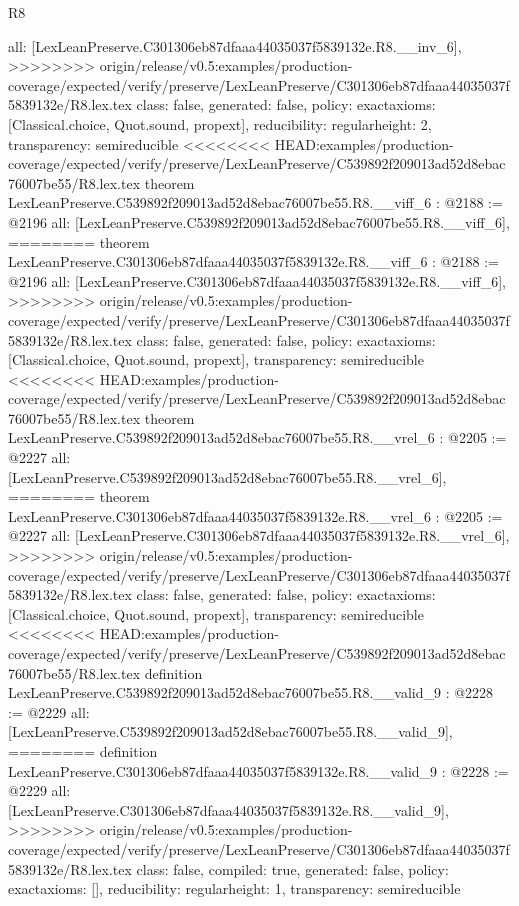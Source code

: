 \begin{lexlean}{R8}
\begin{coremodule}
{{{{{{{{{{{{  all: [LexLeanPreserve.C301306eb87dfaaa44035037f5839132e.R8.__inv_6],
>>>>>>>> origin/release/v0.5:examples/production-coverage/expected/verify/preserve/LexLeanPreserve/C301306eb87dfaaa44035037f5839132e/R8.lex.tex
  class: false,
  generated: false,
  policy: exact{axioms: [Classical.choice, Quot.sound, propext]},
  reducibility: regular{height: 2},
  transparency: semireducible
}
<<<<<<<< HEAD:examples/production-coverage/expected/verify/preserve/LexLeanPreserve/C539892f209013ad52d8ebac76007be55/R8.lex.tex
theorem LexLeanPreserve.C539892f209013ad52d8ebac76007be55.R8.__viff_6 : @2188 := @2196 {
  all: [LexLeanPreserve.C539892f209013ad52d8ebac76007be55.R8.__viff_6],
========
theorem LexLeanPreserve.C301306eb87dfaaa44035037f5839132e.R8.__viff_6 : @2188 := @2196 {
  all: [LexLeanPreserve.C301306eb87dfaaa44035037f5839132e.R8.__viff_6],
>>>>>>>> origin/release/v0.5:examples/production-coverage/expected/verify/preserve/LexLeanPreserve/C301306eb87dfaaa44035037f5839132e/R8.lex.tex
  class: false,
  generated: false,
  policy: exact{axioms: [Classical.choice, Quot.sound, propext]},
  transparency: semireducible
}
<<<<<<<< HEAD:examples/production-coverage/expected/verify/preserve/LexLeanPreserve/C539892f209013ad52d8ebac76007be55/R8.lex.tex
theorem LexLeanPreserve.C539892f209013ad52d8ebac76007be55.R8.__vrel_6 : @2205 := @2227 {
  all: [LexLeanPreserve.C539892f209013ad52d8ebac76007be55.R8.__vrel_6],
========
theorem LexLeanPreserve.C301306eb87dfaaa44035037f5839132e.R8.__vrel_6 : @2205 := @2227 {
  all: [LexLeanPreserve.C301306eb87dfaaa44035037f5839132e.R8.__vrel_6],
>>>>>>>> origin/release/v0.5:examples/production-coverage/expected/verify/preserve/LexLeanPreserve/C301306eb87dfaaa44035037f5839132e/R8.lex.tex
  class: false,
  generated: false,
  policy: exact{axioms: [Classical.choice, Quot.sound, propext]},
  transparency: semireducible
}
<<<<<<<< HEAD:examples/production-coverage/expected/verify/preserve/LexLeanPreserve/C539892f209013ad52d8ebac76007be55/R8.lex.tex
definition LexLeanPreserve.C539892f209013ad52d8ebac76007be55.R8.__valid_9 : @2228 := @2229 {
  all: [LexLeanPreserve.C539892f209013ad52d8ebac76007be55.R8.__valid_9],
========
definition LexLeanPreserve.C301306eb87dfaaa44035037f5839132e.R8.__valid_9 : @2228 := @2229 {
  all: [LexLeanPreserve.C301306eb87dfaaa44035037f5839132e.R8.__valid_9],
>>>>>>>> origin/release/v0.5:examples/production-coverage/expected/verify/preserve/LexLeanPreserve/C301306eb87dfaaa44035037f5839132e/R8.lex.tex
  class: false,
  compiled: true,
  generated: false,
  policy: exact{axioms: []},
  reducibility: regular{height: 1},
  transparency: semireducible
}}}}}}}}}}}}}}}
\end{coremodule}
\end{lexlean}
